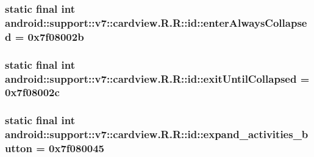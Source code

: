\hypertarget{classandroid_1_1support_1_1v7_1_1cardview_1_1_r_1_1id_3da125c682b8cc104b608e1efc16069d}{
\subsubsection[{enterAlwaysCollapsed}]{\setlength{\rightskip}{0pt plus 5cm}static final int android::support::v7::cardview.R.R::id::enterAlwaysCollapsed = 0x7f08002b}}
\label{classandroid_1_1support_1_1v7_1_1cardview_1_1_r_1_1id_3da125c682b8cc104b608e1efc16069d}


\hypertarget{classandroid_1_1support_1_1v7_1_1cardview_1_1_r_1_1id_b96813dce7f624e8c70e0669c3593e72}{
\subsubsection[{exitUntilCollapsed}]{\setlength{\rightskip}{0pt plus 5cm}static final int android::support::v7::cardview.R.R::id::exitUntilCollapsed = 0x7f08002c}}
\label{classandroid_1_1support_1_1v7_1_1cardview_1_1_r_1_1id_b96813dce7f624e8c70e0669c3593e72}


\hypertarget{classandroid_1_1support_1_1v7_1_1cardview_1_1_r_1_1id_9adff0a1627585ed58e8ccabfb44fd79}{
\subsubsection[{expand\_\-activities\_\-button}]{\setlength{\rightskip}{0pt plus 5cm}static final int android::support::v7::cardview.R.R::id::expand\_\-activities\_\-button = 0x7f080045}}
\label{classandroid_1_1support_1_1v7_1_1cardview_1_1_r_1_1id_9adff0a1627585ed58e8ccabfb44fd79}


